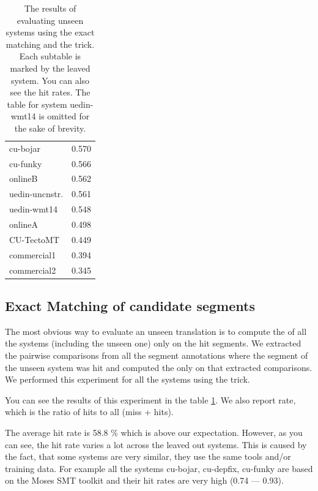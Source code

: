 \begin{table}
{\begin{tabular}{|l|c|}
           cu-bojar            &   0.570 \\
           cu-funky            &   0.566 \\
           onlineB                &   0.562 \\
           uedin-uncnstr. &   0.561 \\
           uedin-wmt14         &   0.548 \\
           onlineA                &   0.498 \\
           CU-TectoMT          &   0.449 \\
           commercial1         &   0.394 \\
           commercial2         &   0.345 \\
          \hline
         \end{tabular}
      \label{}
    }

    \caption[Results of evaluating unseen systems by exact matching]{The
      results of evaluating unseen systems using the exact matching and the
       trick. Each subtable is marked by the leaved
      system.  You can also see the hit rates. The table for system uedin-wmt14
      is omitted for the sake of brevity.}

  \label{one-out-results}
\end{table}

\subsection{Exact Matching of candidate segments}

The most obvious way to evaluate an unseen translation is to compute the
 of all the systems (including the unseen
one) only on the hit segments. We extracted the pairwise comparisons from all
the segment annotations where the segment of the unseen system was hit and
computed the  only on that extracted
comparisons. We performed this experiment for all the systems using the
 trick.

You can see the results of this experiment in the table \ref{one-out-results}.
We also report  rate, which is the ratio of hits to all (miss +
hits).

The average hit rate is 58.8 \% which is above our expectation. However, as you
can see, the hit rate varies a lot across the leaved out systems. This is
caused by the fact, that some systems are very similar, they use the same tools
and/or training data. For example all the systems cu-bojar, cu-depfix, cu-funky
are based on the Moses SMT toolkit and their hit rates are very high (0.74 ---
0.93).

